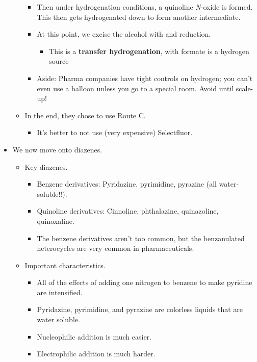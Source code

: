 \documentclass[../notes.tex]{subfiles}
\begin{document}
\begin{itemize}
\begin{itemize}
\begin{itemize}
            \item Then under hydrogenation conditions, a quinoline \emph{N}-oxide is formed. This then gets hydrogenated down to form another intermediate.
            \item At this point, we excise the alcohol  with  and reduction.
            \begin{itemize}
                \item This is a \textbf{transfer hydrogenation}, with formate is a hydrogen source
            \end{itemize}
            \item Aside: Pharma companies have tight controls on hydrogen; you can't even use a balloon unless you go to a special room. Avoid until scale-up!
        \end{itemize}
        \item In the end, they chose to use Route C.
        \begin{itemize}
            \item It's better to not use (very expensive) Selectfluor.
        \end{itemize}
    \end{itemize}
    \item We now move onto diazenes.
    \begin{itemize}
        \item Key diazenes.
        \begin{itemize}
            \item Benzene derivatives: Pyridazine, pyrimidine, pyrazine (all water-soluble!!).
            \item Quinoline derivatives: Cinnoline, phthalazine, quinazoline, quinoxaline.
            \item The benzene derivatives aren't too common, but the benzanulated heterocycles are very common in pharmaceuticals.
        \end{itemize}
        \item Important characteristics.
        \begin{itemize}
            \item All of the effects of adding one nitrogen to benzene to make pyridine are intensified.
            \item Pyridazine, pyrimidine, and pyrazine are colorless liquids that are water soluble.
            \item Nucleophilic addition is much easier.
            \item Electrophilic addition is much harder.

\end{itemize}
\end{itemize}
\end{itemize}
\end{document}
